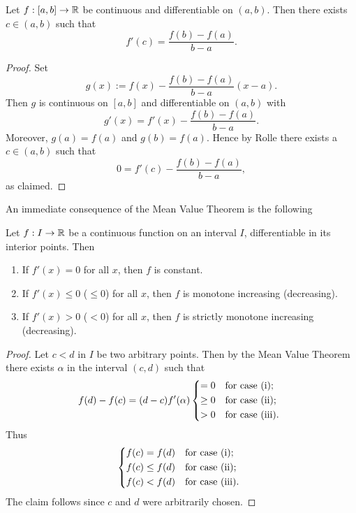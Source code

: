 \documentclass[10pt, a4paper]{article}
\begin{document}
\begin{theorem}\label{pre:analy:thm:meanvaluethm}
    Let $f : [a, b] \rightarrow \mathbb{R}$ be continuous and differentiable on $(a, b)$.
    Then there exists $c \in (a, b)$ such that
    \[
    f'(c) = \frac{f(b) - f(a)}{b - a}.
    \]
    \begin{proof}
        Set
        \[
        g(x) := f(x) - \frac{f(b) - f(a)}{b - a}(x - a).
        \]
        Then $g$ is continuous on $[a, b]$ and differentiable on $(a, b)$ with
        \[
        g'(x) = f'(x) - \frac{f(b) - f(a)}{b - a}.
        \]
        Moreover,
        $g(a) = f(a)$ and $g(b) = f(a)$.
        Hence by Rolle there exists a $c \in (a, b)$ such that
        \[
        0 = f'(c) - \frac{f(b) - f(a)}{b - a},
        \]
        as claimed.
    \end{proof}
\end{theorem}

An immediate consequence of the Mean Value Theorem is the following
\begin{theorem}\label{pre:analy:thm:contdiffthenfunchasprops}
    Let $f : I \rightarrow \mathbb{R}$ be a continuous function on an interval $I$,
    differentiable in its interior points.
    Then
    \begin{enumerate}[label = (\roman*)]
        \item If $f'(x) = 0$ for all $x$,
        then $f$ is constant.
        \item If $f'(x) \leq 0$ ($\leq 0$) for all $x$,
        then $f$ is monotone increasing
        (decreasing).
        \item If $f'(x) > 0$ ($< 0$) for all $x$,
        then $f$ is strictly monotone increasing
        (decreasing).
    \end{enumerate}
    \begin{proof}
        Let $c < d$ in $I$ be two arbitrary points.
        Then by the Mean Value Theorem there exists $\alpha$ in the interval $(c, d)$ such that
        \[
        f(d) - f(c) = (d - c)f'(\alpha) \begin{dcases*}
            = 0 & for case (i); \\
            \geq 0 & for case (ii); \\
            > 0 & for case (iii).
        \end{dcases*}
        \]
        Thus
        \[
        \begin{dcases*}
            f(c) = f(d) & for case (i); \\
            f(c) \leq f(d) & for case (ii); \\
            f(c) < f(d) & for case (iii).
        \end{dcases*}
        \]
        The claim follows since $c$ and $d$ were arbitrarily chosen.
    \end{proof}
\end{theorem}
\end{document}
